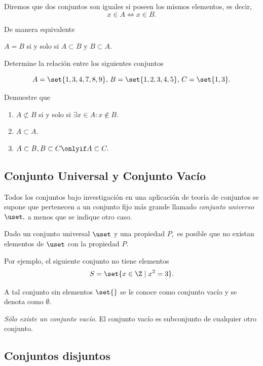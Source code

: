 	Diremos que dos conjuntos son iguales si poseen los mismos elementos, es decir, 
	$$
	x \in A \iff x \in B.
	$$

	De manera equivalente 
	\begin{center}
		$A=B$ si y solo si $A \subset B$ y $B \subset A.$
	\end{center}

	\begin{problema}
		\label{lip:exmp:1.2}
		Determine la relación entre los siguientes conjuntos
		\begin{center}
			$$A=\set{1,3,4,7,8,9}, \, 
			B=\set{1,2,3,4,5}, \,
			C=\set{1,3}.$$
		\end{center}
	\end{problema}

	\begin{problema}
		Demuestre que 
		\begin{enumerate}
			\item $A\not\subset B$ si y solo si $\exists x\in A: x\notin B.$
			\item $A \subset A.$
			\item $A\subset B, B\subset C \onlyif  A\subset C.$
		\end{enumerate}
	\end{problema}

\subsection{Conjunto Universal y Conjunto Vacío}

	Todos los conjuntos bajo investigación en una aplicación de teoría de conjuntos se supone que pertenecen a un conjunto fijo más grande llamado \emph{conjunto universo} $\uset,$ a menos que se indique otro caso.

	Dado un conjunto universal $\uset$ y una propiedad $P,$ es posible que no existan elementos de $\uset$ con la propiedad $P.$ 

	Por ejemplo, el siguiente conjunto no tiene elementos
	$$
	S=\set{x\in \Z \mid x^{2}=3}.
	$$

	A tal conjunto sin elementos $\set{}$ se le conoce como conjunto vacío y se denota como $\emptyset.$

	\begin{observacion}
		\emph{Sólo existe un conjunto vacío}.  El conjunto vacío es subconjunto de cualquier otro conjunto.
	\end{observacion}

\subsection{Conjuntos disjuntos}

